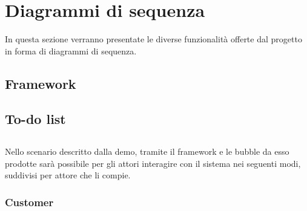 \section{Diagrammi di sequenza}
In questa sezione verranno presentate le diverse funzionalità offerte dal progetto in forma di diagrammi di sequenza.

\subsection{Framework}


\subsection{To-do list}



\subsection{\DemoName}
Nello scenario descritto dalla demo, tramite il framework e le bubble da esso prodotte sarà possibile per gli attori interagire con il sistema nei seguenti modi, suddivisi per attore che li compie.

\subsubsection{Customer}

